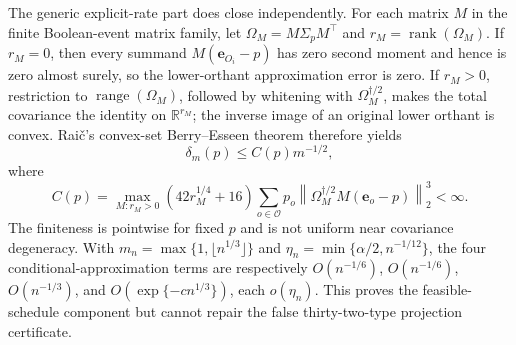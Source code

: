 The generic explicit-rate part does close independently.  For each matrix \(M\) in the finite Boolean-event matrix family, let \(\Omega_M=M\Sigma_pM^{\top}\) and \(r_M=\operatorname{rank}(\Omega_M)\).  If \(r_M=0\), then every summand \(M(\mathbf e_{O_i}-p)\) has zero second moment and hence is zero almost surely, so the lower-orthant approximation error is zero.  If \(r_M>0\), restriction to \(\operatorname{range}(\Omega_M)\), followed by whitening with \(\Omega_M^{\dagger/2}\), makes the total covariance the identity on \(\mathbb R^{r_M}\); the inverse image of an original lower orthant is convex.  Rai\v{c}'s convex-set Berry--Esseen theorem therefore yields
\[
\delta_m(p)\leq C(p)m^{-1/2},
\]
where
\[
C(p)=\max_{M:r_M>0}
\left(42r_M^{1/4}+16\right)
\sum_{o\in\mathcal O}p_o
\left\|\Omega_M^{\dagger/2}M(\mathbf e_o-p)\right\|_2^3<\infty.
\]
The finiteness is pointwise for fixed \(p\) and is not uniform near covariance degeneracy.  With \(m_n=\max\{1,\lfloor n^{1/3}\rfloor\}\) and \(\eta_n=\min\{\alpha/2,n^{-1/12}\}\), the four conditional-approximation terms are respectively \(O(n^{-1/6})\), \(O(n^{-1/6})\), \(O(n^{-1/3})\), and \(O(\exp\{-c n^{1/3}\})\), each \(o(\eta_n)\).  This proves the feasible-schedule component but cannot repair the false thirty-two-type projection certificate.